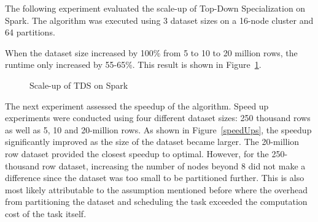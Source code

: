 \documentclass[11pt]{article}       %
\begin{document}
The following experiment evaluated the scale-up of Top-Down Specialization on Spark. The algorithm was executed using 3 dataset sizes on a 16-node cluster and 64 partitions.

When the dataset size increased by 100\% from 5 to 10 to 20 million rows, the runtime only increased by 55-65\%. This result is shown in Figure~\ref{scaleUp}.

\begin{figure}[h]
\centering
{}
\caption{Scale-up of TDS on Spark}
\label{scaleUp}
\end{figure}

The next experiment assessed the speedup of the algorithm. Speed up experiments were conducted using four different dataset sizes: 250 thousand rows as well as 5, 10 and 20-million rows. As shown in Figure~\ref{speedUps}, the speedup significantly improved as the size of the dataset became larger. The 20-million row dataset provided the closest speedup to optimal. However, for the 250-thousand row dataset, increasing the number of nodes beyond 8 did not make a difference since the  dataset was too small to be partitioned further. This is also most likely attributable to the assumption mentioned before where the overhead from partitioning the dataset and scheduling the task exceeded the computation cost of the task itself.
\end{document}
